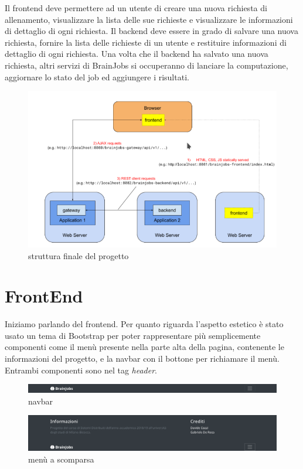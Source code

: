 \documentclass[a4paper,12pt, oneside]{book}
\begin{document}
Il frontend deve permettere ad un utente di creare una nuova richiesta di allenamento,
visualizzare la lista delle sue richieste e visualizzare le informazioni di dettaglio di ogni
richiesta.
Il backend deve essere in grado di salvare una nuova richiesta, fornire la lista delle richieste
di un utente e restituire informazioni di dettaglio di ogni richiesta.
Una volta che il backend ha salvato una nuova richiesta, altri servizi di BrainJobs si
occuperanno di lanciare la computazione, aggiornare lo stato del job ed aggiungere i
risultati.\\
\begin{figure}[h!]
  \centering
  \includegraphics[scale = 0.7]{img/struttura.png}
  \caption{struttura finale del progetto}
\end{figure}
\chapter{FrontEnd}
Iniziamo parlando del frontend. Per quanto riguarda l'aspetto estetico è stato usato un tema di Bootstrap
per poter rappresentare più semplicemente componenti come il menù presente nella parte alta
della pagina, contenente le informazioni del progetto, e la navbar con il bottone per richiamare il menù. Entrambi componenti sono nel tag \textit{header}.

\begin{figure}[h!]
  \centering
  \includegraphics[scale = 0.385]{img/navbar.png}
  \caption{navbar}
\end{figure}
\begin{figure}[h!]
  \centering
  \includegraphics[scale = 0.385]{img/menu.png}
  \caption{menù a scomparsa}
\end{figure}
\end{document}
